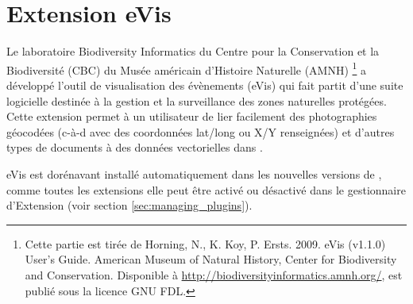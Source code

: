 
\section{Extension eVis}\label{sec:evis}


Le laboratoire Biodiversity Informatics du Centre pour la Conservation et la Biodiversité (CBC) du Musée américain d'Histoire Naturelle (AMNH) \footnote{Cette partie est tirée de Horning, N., K. Koy, P. Ersts. 2009. eVis (v1.1.0) User's Guide. American Museum of
Natural History, Center for Biodiversity and Conservation. Disponible à \url{http://biodiversityinformatics.amnh.org/}, est publié sous la licence GNU FDL.} a développé l'outil de visualisation des évènements (eVis) qui fait partit d'une suite logicielle destinée à la gestion et la surveillance des zones naturelles protégées. Cette extension permet à un utilisateur de lier facilement des photographies géocodées (c-à-d avec des coordonnées lat/long ou X/Y renseignées) et d'autres types de documents à des données vectorielles dans \qg.


eVis est dorénavant installé automatiquement dans les nouvelles versions de \qg, comme toutes les extensions elle peut être activé ou désactivé dans le gestionnaire d'Extension (voir section \ref{sec:managing_plugins}).

